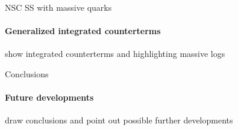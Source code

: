 
\begin{frame}{NSC SS with massive quarks}
  \framesubtitle{Generalized integrated counterterms}

  show integrated counterterms and highlighting massive logs

\end{frame}



\begin{frame}{Conclusions}
  \framesubtitle{Future developments}

  draw conclusions and point out possible further developments

\end{frame}










